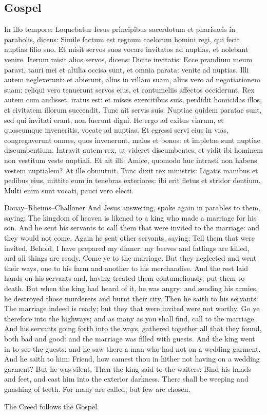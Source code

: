 \subsection{Gospel}\label{proper-gospel}
\begin{latinproper}
In illo tempore: Loquebatur Iesus principibus sacerdotum et pharisaeis in parabolis, dicens: Simile factum est regnum caelorum homini regi, qui fecit nuptias filio suo. Et misit servos suos vocare invitatos ad nuptias, et nolebant venire. Iterum misit alios servos, dicens: Dicite invitatis: Ecce prandium meum paravi, tauri mei et altilia occisa sunt, et omnia parata: venite ad nuptias. Illi autem neglexerunt: et abierunt, alius in villam suam, alius vero ad negotiationem suam: reliqui vero tenuerunt servos eius, et contumeliis affectos occiderunt. Rex autem cum audisset, iratus est: et missis exercitibus suis, perdidit homicidas illos, et civitatem illorum succendit. Tunc ait servis suis: Nuptiae quidem paratae sunt, sed qui invitati erant, non fuerunt digni. Ite ergo ad exitus viarum, et quoscumque inveneritis, vocate ad nuptias. Et egressi servi eius in vias, congregaverunt omnes, quos invenerunt, malos et bonos: et impletae sunt nuptiae discumbentium. Intravit autem rex, ut videret discumbentes, et vidit ibi hominem non vestitum veste nuptiali. Et ait illi: Amice, quomodo huc intrasti non habens vestem nuptialem? At ille obmutuit. Tunc dixit rex ministris: Ligatis manibus et pedibus eius, mittite eum in tenebras exteriores: ibi erit fletus et stridor dentium. Multi enim sunt vocati, pauci vero electi.
\end{latinproper}
\begin{englishwitness}{Douay--Rheims--Challoner}
And Jesus answering, spoke again in parables to them, saying: The kingdom of heaven is likened to a king who made a marriage for his son. And he sent his servants to call them that were invited to the marriage: and they would not come. Again he sent other servants, saying: Tell them that were invited, Behold, I have prepared my dinner: my beeves and fatlings are killed, and all things are ready. Come ye to the marriage. But they neglected and went their ways, one to his farm and another to his merchandise. And the rest laid hands on his servants and, having treated them contumeliously, put them to death. But when the king had heard of it, he was angry: and sending his armies, he destroyed those murderers and burnt their city. Then he saith to his servants: The marriage indeed is ready; but they that were invited were not worthy. Go ye therefore into the highways; and as many as you shall find, call to the marriage. And his servants going forth into the ways, gathered together all that they found, both bad and good: and the marriage was filled with guests. And the king went in to see the guests: and he saw there a man who had not on a wedding garment. And he saith to him: Friend, how camest thou in hither not having on a wedding garment? But he was silent. Then the king said to the waiters: Bind his hands and feet, and cast him into the exterior darkness. There shall be weeping and gnashing of teeth. For many are called, but few are chosen.
\end{englishwitness}
The Creed follows the Gospel.

